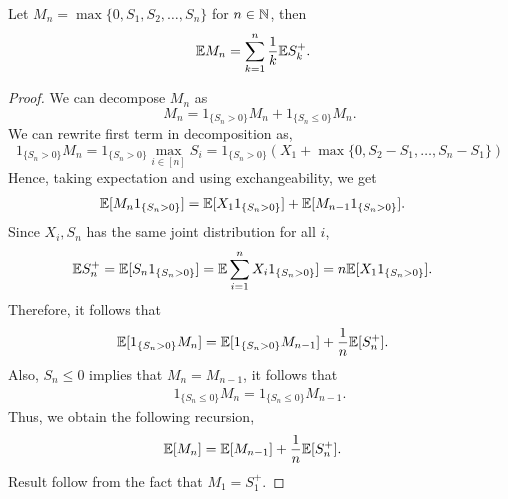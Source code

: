\documentclass[a4paper,10pt,english]{article}
\begin{document}
\begin{prop} Let $M_n=\max\{0,S_1,S_2, \ldots, S_n\}$ for $n \in \mathbb{N}$, then %
\begin{align*}
\mathbb{E} M_n &= \sum_{k=1}^{n} \frac{1}{k} \mathbb{E} S_k^+.
\end{align*}
\end{prop}
\begin{proof}
We can decompose $M_n$ as 
\begin{equation*}
M_n=1_{\{S_n>0\}}M_n+1_{\{S_n \leq 0\}}M_n.
\end{equation*}
We can rewrite first term in decomposition as, 
\begin{equation*}
1_{\{S_n>0\}}M_n= 1_{\{S_n>0\}}\max_{i \in [n]}S_i = 1_{\{S_n>0\}}(X_1+\max\{0,S_2 - S_1,\ldots, S_n - S_1\})
\end{equation*}
Hence, taking expectation and using exchangeability, we get 
\begin{align*}
\E[M_n1_{\{S_n>0\}}] &= %
\E[X_11_{\{S_n>0\}}]  + \E[M_{n-1}1_{\{S_n>0\}}].
\end{align*}
Since $X_i,S_n$ has the same joint distribution for all $i$,
\begin{align*}
\mathbb{E} S_n^+ &= \mathbb{E}[S_n1_{\{S_n>0\}}]=\mathbb{E}\sum_{i=1}^{n}X_i 1_{\{S_n>0\}}]=n\mathbb{E}[X_11_{\{S_n>0\}}].
\end{align*}
Therefore, it follows that
\begin{align*}
\mathbb{E}[1_{\{S_n>0\}}M_n] &=\mathbb{E}[1_{\{S_n>0\}}M_{n-1}]+\frac{1}{n}\mathbb{E}[S_n^+].
\end{align*}
Also, $S_n \leq 0$ implies that $M_n=M_{n-1}$, it follows that
\begin{align*}
1_{\{S_n\leq 0\}}M_n=1_{\{S_n\leq 0\}}M_{n-1}.
\end{align*}
Thus, we obtain the following recursion,
\begin{align*}
\mathbb{E}[M_n]&=\mathbb{E}[M_{n-1}]+\frac{1}{n}\mathbb{E}[S_n^+].
\end{align*}
Result follow from the fact that $M_1 =S_1^+$.
\end{proof}
\end{document}
